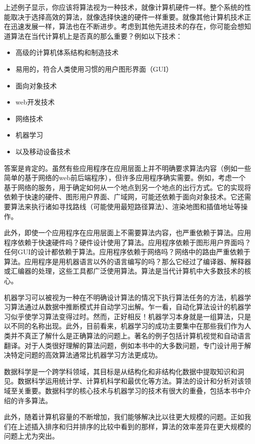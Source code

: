 \documentclass[lang=cn,newtx,10pt,scheme=chinese]{elegantbook}
\begin{document}
上述例子显示，你应该将算法视为一种技术，就像计算机硬件一样。整个系统的性能取决于选择高效的算法，就像选择快速的硬件一样重要。就像其他计算机技术正在迅速发展一样，算法也在不断进步。考虑到其他先进技术的存在，你可能会想知道算法在当代计算机上是否真的那么重要？例如以下技术：

\begin{itemize}
    \item 高级的计算机体系结构和制造技术
    \item 易用的，符合人类使用习惯的用户图形界面（GUI）
    \item 面向对象技术
    \item web开发技术
    \item 网络技术
    \item 机器学习
    \item 以及移动设备技术
\end{itemize}

答案是肯定的。虽然有些应用程序在应用层面上并不明确要求算法内容（例如一些简单的基于网络的web前后端程序），但许多应用程序确实需要。例如，考虑一个基于网络的服务，用于确定如何从一个地点到另一个地点的出行方式。它的实现将依赖于快速的硬件、图形用户界面、广域网，可能还依赖于面向对象技术。它还需要算法来执行诸如寻找路线（可能使用最短路径算法）、渲染地图和插值地址等操作。

此外，即使一个应用程序在应用层面上不需要算法内容，也严重依赖于算法。应用程序依赖于快速硬件吗？硬件设计使用了算法。应用程序依赖于图形用户界面吗？任何GUI的设计都依赖于算法。应用程序依赖于网络吗？网络中的路由严重依赖于算法。应用程序是用机器语言以外的语言编写的吗？那么它经过了编译器、解释器或汇编器的处理，这些工具都广泛使用算法。算法是当代计算机中大多数技术的核心。

机器学习可以被视为一种在不明确设计算法的情况下执行算法任务的方法，机器学习算法通过从数据中推断模式并自动学习出解。乍一看，自动化算法设计的机器学习似乎使学习算法变得过时。然而，正好相反！机器学习本身就是一组算法，只是以不同的名称出现。此外，目前看来，机器学习的成功主要集中在那些我们作为人类并不真正了解什么是正确算法的问题上。著名的例子包括计算机视觉和自动语言翻译。对于人类很好理解的算法问题，例如本书中的大多数问题，专门设计用于解决特定问题的高效算法通常比机器学习方法更成功。

数据科学是一个跨学科领域，其目标是从结构化和非结构化数据中提取知识和洞见。数据科学运用统计学、计算机科学和最优化等方法。算法的设计和分析对该领域至关重要。数据科学的核心技术与机器学习的技术有很大的重叠，包括本书中介绍的许多算法。

此外，随着计算机容量的不断增加，我们能够解决比以往更大规模的问题。正如我们在上述插入排序和归并排序的比较中看到的那样，算法的效率差异在更大规模的问题上尤为突出。
\end{document}
